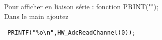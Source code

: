 \documentclass{article}
\begin{document}

Pour afficher en liaison série : fonction PRINT(""); \\
Dans le main ajoutez \\
\begin{verbatim}
 PRINTF("%o\n",HW_AdcReadChannel(0));
\end{verbatim}
\end{document}
